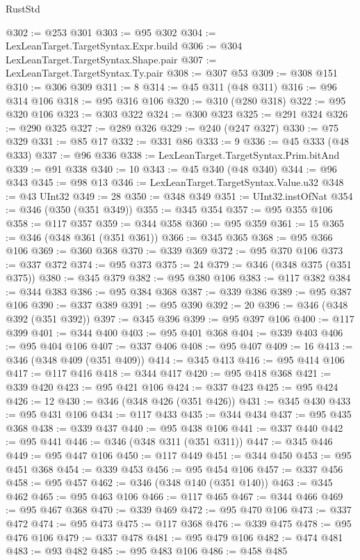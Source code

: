 \begin{lexlean}{RustStd}
\begin{coremodule}
{\begin{coremodule}
{{{{{{{{{{{{{{{{{{{{{{{{{{{{{{{{{{{{{{{@302 := @253 @301
@303 := @95 @302
@304 := LexLeanTarget.TargetSyntax.Expr.build
@306 := @304 LexLeanTarget.TargetSyntax.Shape.pair
@307 := LexLeanTarget.TargetSyntax.Ty.pair
@308 := @307 @53
@309 := @308 @151
@310 := @306 @309
@311 := 8
@314 := @45 @311 (@48 @311)
@316 := @96 @314 @106
@318 := @95 @316 @106
@320 := @310 (@280 @318)
@322 := @95 @320 @106
@323 := @303 @322
@324 := @300 @323
@325 := @291 @324
@326 := @290 @325
@327 := @289 @326
@329 := @240 (@247 @327)
@330 := @75 @329
@331 := @85 @17
@332 := @331 @86
@333 := 9
@336 := @45 @333 (@48 @333)
@337 := @96 @336
@338 := LexLeanTarget.TargetSyntax.Prim.bitAnd
@339 := @91 @338
@340 := 10
@343 := @45 @340 (@48 @340)
@344 := @96 @343
@345 := @98 @13
@346 := LexLeanTarget.TargetSyntax.Value.u32
@348 := @43 UInt32
@349 := 28
@350 := @348 @349
@351 := UInt32.instOfNat
@354 := @346 (@350 (@351 @349))
@355 := @345 @354
@357 := @95 @355 @106
@358 := @117 @357
@359 := @344 @358
@360 := @95 @359
@361 := 15
@365 := @346 (@348 @361 (@351 @361))
@366 := @345 @365
@368 := @95 @366 @106
@369 := @360 @368
@370 := @339 @369
@372 := @95 @370 @106
@373 := @337 @372
@374 := @95 @373
@375 := 24
@379 := @346 (@348 @375 (@351 @375))
@380 := @345 @379
@382 := @95 @380 @106
@383 := @117 @382
@384 := @344 @383
@386 := @95 @384 @368
@387 := @339 @386
@389 := @95 @387 @106
@390 := @337 @389
@391 := @95 @390
@392 := 20
@396 := @346 (@348 @392 (@351 @392))
@397 := @345 @396
@399 := @95 @397 @106
@400 := @117 @399
@401 := @344 @400
@403 := @95 @401 @368
@404 := @339 @403
@406 := @95 @404 @106
@407 := @337 @406
@408 := @95 @407
@409 := 16
@413 := @346 (@348 @409 (@351 @409))
@414 := @345 @413
@416 := @95 @414 @106
@417 := @117 @416
@418 := @344 @417
@420 := @95 @418 @368
@421 := @339 @420
@423 := @95 @421 @106
@424 := @337 @423
@425 := @95 @424
@426 := 12
@430 := @346 (@348 @426 (@351 @426))
@431 := @345 @430
@433 := @95 @431 @106
@434 := @117 @433
@435 := @344 @434
@437 := @95 @435 @368
@438 := @339 @437
@440 := @95 @438 @106
@441 := @337 @440
@442 := @95 @441
@446 := @346 (@348 @311 (@351 @311))
@447 := @345 @446
@449 := @95 @447 @106
@450 := @117 @449
@451 := @344 @450
@453 := @95 @451 @368
@454 := @339 @453
@456 := @95 @454 @106
@457 := @337 @456
@458 := @95 @457
@462 := @346 (@348 @140 (@351 @140))
@463 := @345 @462
@465 := @95 @463 @106
@466 := @117 @465
@467 := @344 @466
@469 := @95 @467 @368
@470 := @339 @469
@472 := @95 @470 @106
@473 := @337 @472
@474 := @95 @473
@475 := @117 @368
@476 := @339 @475
@478 := @95 @476 @106
@479 := @337 @478
@481 := @95 @479 @106
@482 := @474 @481
@483 := @93 @482
@485 := @95 @483 @106
@486 := @458 @485
}}}}}}}}}}}}}}}}}}}}}}}}}}}}}}}}}}}}}}}
\end{coremodule}}
\end{coremodule}
\end{lexlean}
